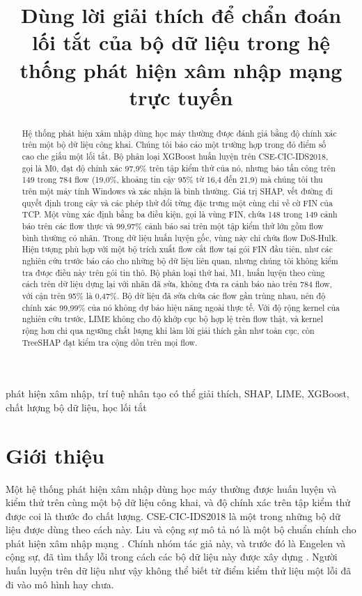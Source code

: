 \documentclass[conference]{IEEEtran}
\begin{document}
\title{Dùng lời giải thích để chẩn đoán lối tắt của bộ dữ liệu trong hệ thống phát hiện xâm nhập mạng trực tuyến}

\author{
}

\maketitle

\begin{abstract}
Hệ thống phát hiện xâm nhập dùng học máy thường được đánh giá bằng độ chính xác trên một bộ dữ liệu công khai. Chúng tôi báo cáo một trường hợp trong đó điểm số cao che giấu một lối tắt. Bộ phân loại XGBoost huấn luyện trên CSE-CIC-IDS2018, gọi là M0, đạt độ chính xác 97,9\% trên tập kiểm thử của nó, nhưng báo tấn công trên 149 trong 784 flow (19,0\%, khoảng tin cậy 95\% từ 16,4 đến 21,9) mà chúng tôi thu trên một máy tính Windows và xác nhận là bình thường. Giá trị SHAP, vết đường đi quyết định trong cây và các phép thử đổi từng đặc trưng một cùng chỉ về cờ FIN của TCP. Một vùng xác định bằng ba điều kiện, gọi là vùng FIN, chứa 148 trong 149 cảnh báo trên các flow thực và 99,97\% cảnh báo sai trên một tập kiểm thử lớn gồm flow bình thường có nhãn. Trong dữ liệu huấn luyện gốc, vùng này chỉ chứa flow DoS-Hulk. Hiện tượng phù hợp với một bộ trích xuất flow cắt flow tại gói FIN đầu tiên, như các nghiên cứu trước báo cáo cho những bộ dữ liệu liên quan, nhưng chúng tôi không kiểm tra được điều này trên gói tin thô. Bộ phân loại thứ hai, M1, huấn luyện theo cùng cách trên dữ liệu dựng lại với nhãn đã sửa, không đưa ra cảnh báo nào trên 784 flow, với cận trên 95\% là 0,47\%. Bộ dữ liệu đã sửa chứa các flow gần trùng nhau, nên độ chính xác 99,99\% của nó không dự báo hiệu năng ngoài thực tế. Với độ rộng kernel của nghiên cứu trước, LIME không cho độ khớp cục bộ hợp lệ trên flow thật, và kernel rộng hơn chỉ qua ngưỡng chất lượng khi làm lời giải thích gần như toàn cục, còn TreeSHAP đạt kiểm tra cộng dồn trên mọi flow.
\end{abstract}

\begin{IEEEkeywords}
phát hiện xâm nhập, trí tuệ nhân tạo có thể giải thích, SHAP, LIME, XGBoost, chất lượng bộ dữ liệu, học lối tắt
\end{IEEEkeywords}

\section{Giới thiệu}
Một hệ thống phát hiện xâm nhập dùng học máy thường được huấn luyện và kiểm thử trên cùng một bộ dữ liệu công khai, và độ chính xác trên tập kiểm thử được coi là thước đo chất lượng. CSE-CIC-IDS2018 \cite{sharafaldin2018} là một trong những bộ dữ liệu được dùng theo cách này. Liu và cộng sự mô tả nó là một bộ chuẩn chính cho phát hiện xâm nhập mạng \cite{liu2022}. Chính nhóm tác giả này, và trước đó là Engelen và cộng sự, đã tìm thấy lỗi trong cách các bộ dữ liệu này được xây dựng \cite{engelen2021,liu2022}. Người huấn luyện trên dữ liệu như vậy không thể biết từ điểm kiểm thử liệu một lỗi đã đi vào mô hình hay chưa.
\end{document}
